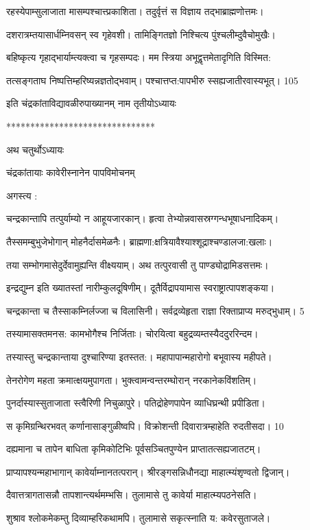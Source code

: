  रहस्येपाम्सुलाजाता मासम्पश्चात्त्प्रकाशिता।
 तदुर्वृत्तं स विज्ञाय तद्भाब्राह्मणोत्तमः।

 दशरात्रम्तयासार्धम्निवसन् स्व गृहेवशी।
तामिङ्गितज्ञो निश्चित्य पुंश्चलीम्दुवैचोमुखैः।

 बहिष्कृत्य गृहाद्भार्याम्त्यक्त्वा च गृहसम्पदः।
 मम स्त्रिया अभूद्वृत्तमेतादृगिति विस्मित: 

 तत्सङ्गताघ निष्पत्तिम्हरिष्यन्नज्ञतोद्भवाम्। 
 पश्चात्तप्त:पापभीरु स्सह्यजातीरवास्यभूत्। 105 

 इति चंद्रकांताविद्यावळीरुपाख्यानम् नाम तृतीयोऽध्यायः

*******************************

अथ चतुर्थोऽध्यायः 

चंद्रकांतायाः कावेरीस्नानेन पापविमोचनम् 

अगस्त्य :

चन्द्रकान्तापि तत्पुर्याम्यो न आहूयजारकान्।
 हृत्वा तेभ्योन्नवासस्रग्गन्धभूषाधनादिकम्।

 तैस्समम्बुभुजेभोगान् मोहनैर्दासमेळनैः।
 ब्राह्मणा:क्षत्रियावैश्याश्शूद्राश्चण्डालजा:खलाः।

 तया सम्भोगमासेदुर्देवामुह्यन्ति वीक्ष्ययाम्।
 अथ तत्पुरवासी तु पाण्ड्योद्रामिडसत्तमः।

 इन्द्रद्युम्न इति ख्यातस्तां नारीम्कुलदूषिणीम्।
 दूतैर्विद्रापयामास स्वराष्ट्रात्पापशङ्कया।

 चन्द्रकान्ता च तैस्साकम्निर्लज्जा च विलासिनी।
 सर्वद्रव्येहृता राज्ञा रिक्ताप्राप्य मरुद्भुधाम्। 5

 तस्यामासक्तमनस: कामभोगैश्च निर्जिताः।
 चोरयित्वा बहुद्रव्यम्तस्यैददुररिन्दम।
 

तस्यास्तु चन्द्रकान्ताया दुश्चारिण्या इतस्तत:।
 महापापान्महारोगो बभूवास्य महीपते।

 तेनरोगेण महता क्रमात्क्षयमुपागता।
 भुक्त्वामन्वन्तरम्घोरान् नरकानेकविंशतिम्।

 पुनर्दास्यास्सुताजाता स्त्वैरिणी निचुळापुरे।
 पतिद्रोहेणपापेन व्याधिघ्रन्थी प्रपीडिता।

 स कृमिग्रन्थिरभवत् कर्णानासाङ्गुळीष्वपि।
 विक्रोशन्ती दिवारात्रम्हाहेति रुदतीसदा। 10

  दह्यमाना च तापेन बाधिता कृमिकोटिभिः
   पूर्वसञ्चितपुण्येन प्राप्तातत्सह्यजातटम्।
 
 प्राप्यापश्यन्महाभागान् कावेर्याम्नानतत्परान्।
 श्रीरङ्गसन्निधौनद्या माहात्म्यंशृण्वतो द्विजान्।
 
 दैवात्तत्रागतासन्नौ तापशान्त्यर्थमम्भसि।
 तुलामासे तु कावेर्या माहात्म्यपठनेसति।
 
 शुश्राव श्लोकमेकम्तु दिव्याम्हरिकथामपि।
 तुलामासे सकृत्स्नाति य: कवेरसुताजले।
 
